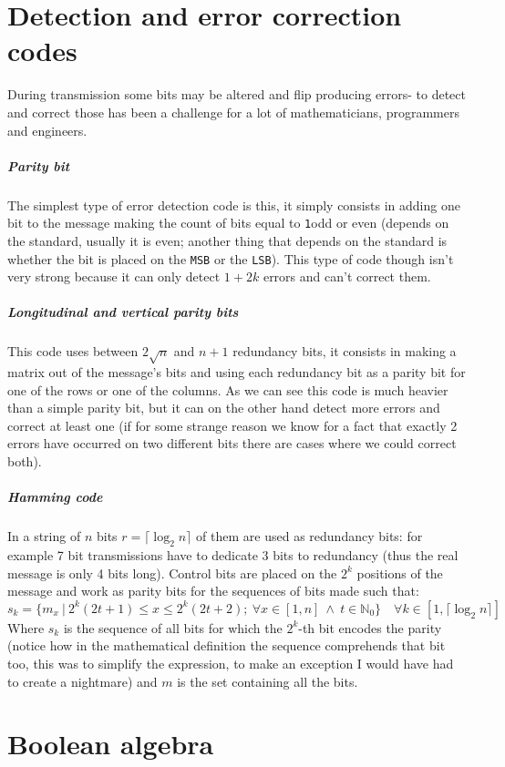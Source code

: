 \documentclass{scrartcl}
\newcommand{\one}{\texttt{1}}
\begin{document}
    \section{Detection and error correction codes}
    During transmission some bits may be altered and flip producing errors- to detect and correct those has been a challenge for a lot of mathematicians, programmers and engineers.
    \subparagraph{Parity bit} The simplest type of error detection code is this, it simply consists in adding one bit to the message making the count of bits equal to \one odd or even (depends on the standard, usually it is even; another thing that depends on the standard is whether the bit is placed on the \texttt{MSB} or the \texttt{LSB}). This type of code though isn't very strong because it can only detect $1+2k$ errors and can't correct them.
    \subparagraph{Longitudinal and vertical parity bits} This code uses between $2\sqrt{n}$ and $n+1$ redundancy bits, it consists in making a matrix out of the message's bits and using each redundancy bit as a parity bit for one of the rows or one of the columns. As we can see this code is much heavier than a simple parity bit, but it can on the other hand detect more errors and correct at least one (if for some strange reason we know for a fact that exactly 2 errors have occurred on two different bits there are cases where we could correct both).
    \subparagraph{Hamming code} In a string of $n$ bits $r=\lceil\log_2{n}\rceil$ of them are used as redundancy bits: for example 7 bit transmissions have to dedicate 3 bits to redundancy (thus the real message is only 4 bits long). Control bits are placed on the $2^k$ positions of the message and work as parity bits for the sequences of bits made such that:
    \begin{equation*}
        s_k=\{m_x\ |\ 2^k(2t+1)\le x \le 2^k(2t+2);\ \forall x \in [1,n] \ \land\ t \in \mathbb{N}_0\}\quad \forall k \in [1,\lceil\log_2{n}\rceil]
    \end{equation*} Where $s_k$ is the sequence of all bits for which the $2^k$-th bit encodes the parity (notice how in the mathematical definition the sequence comprehends that bit too, this was to simplify the expression, to make an exception I would have had to create a nightmare) and $m$ is the set containing all the bits.
    \section{Boolean algebra}
\end{document}
